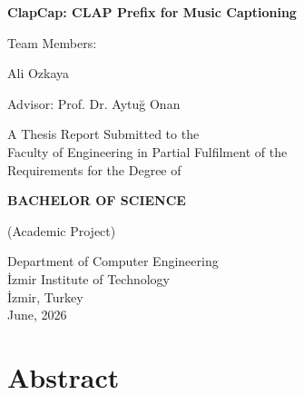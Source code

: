\documentclass[9pt]{report}
\begin{document}
\begin{titlepage}
    \centering
    \vspace*{2cm}

    {\Huge \sffamily \textbf{ClapCap: CLAP Prefix for Music Captioning} \par}
    \vspace{4cm}

    {\large
    \sffamily Team Members:\par
    Ali Ozkaya  \par
    }

    \vspace{1cm}
    {\large \sffamily Advisor: Prof. Dr. Aytu\u{g} Onan }

    \vfill

    {\large \sffamily
    A Thesis Report Submitted to the \\
    Faculty of Engineering in Partial Fulfilment of the \\
    Requirements for the Degree of
    }

    \vspace{0.5cm}
    {\LARGE \sffamily \textbf{BACHELOR OF SCIENCE}}

    \vspace{0.5cm}
    \sffamily (Academic Project)

    \vspace{1cm}
    \sffamily Department of Computer Engineering \\
    İzmir Institute of Technology \\
    İzmir, Turkey \\
    June, 2026
    \vspace*{1cm}

\end{titlepage}

\chapter*{Abstract}
\end{document}
